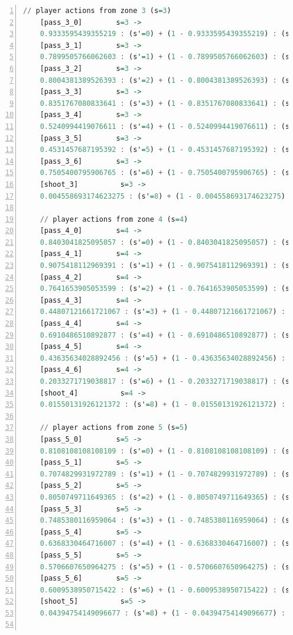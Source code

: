 \documentclass{l4proj}
\begin{document}
\begin{appendices}
\begin{lstlisting}[language=Haskell, numbers=left, caption=Initial MDP specification in the PRISM modelling language.]
	// player actions from zone 3 (s=3)
	[pass_3_0]	      s=3 ->
	0.9333595439355219 : (s'=0) + (1 - 0.9333595439355219) : (s'=7);
	[pass_3_1]	      s=3 ->
	0.7899505766062603 : (s'=1) + (1 - 0.7899505766062603) : (s'=7);
	[pass_3_2]	      s=3 ->
	0.8004381389526393 : (s'=2) + (1 - 0.8004381389526393) : (s'=7);
	[pass_3_3]	      s=3 ->
	0.8351767080833641 : (s'=3) + (1 - 0.8351767080833641) : (s'=7);
	[pass_3_4]	      s=3 ->
	0.5240994419076611 : (s'=4) + (1 - 0.5240994419076611) : (s'=7);
	[pass_3_5]	      s=3 ->
	0.4531457687195392 : (s'=5) + (1 - 0.4531457687195392) : (s'=7);
	[pass_3_6]	      s=3 ->
	0.7505400795906765 : (s'=6) + (1 - 0.7505400795906765) : (s'=7);
	[shoot_3]	       s=3 ->
	0.004558693174623275 : (s'=8) + (1 - 0.004558693174623275) : (s'=7);

	// player actions from zone 4 (s=4)
	[pass_4_0]	      s=4 ->
	0.8403041825095057 : (s'=0) + (1 - 0.8403041825095057) : (s'=7);
	[pass_4_1]	      s=4 ->
	0.9075418112969391 : (s'=1) + (1 - 0.9075418112969391) : (s'=7);
	[pass_4_2]	      s=4 ->
	0.7641653905053599 : (s'=2) + (1 - 0.7641653905053599) : (s'=7);
	[pass_4_3]	      s=4 ->
	0.44807121661721067 : (s'=3) + (1 - 0.44807121661721067) : (s'=7);
	[pass_4_4]	      s=4 ->
	0.6910486510892877 : (s'=4) + (1 - 0.6910486510892877) : (s'=7);
	[pass_4_5]	      s=4 ->
	0.43635634028892456 : (s'=5) + (1 - 0.43635634028892456) : (s'=7);
	[pass_4_6]	      s=4 ->
	0.2033271719038817 : (s'=6) + (1 - 0.2033271719038817) : (s'=7);
	[shoot_4]	       s=4 ->
	0.01550131926121372 : (s'=8) + (1 - 0.01550131926121372) : (s'=7);

	// player actions from zone 5 (s=5)
	[pass_5_0]	      s=5 ->
	0.8108108108108109 : (s'=0) + (1 - 0.8108108108108109) : (s'=7);
	[pass_5_1]	      s=5 ->
	0.7074829931972789 : (s'=1) + (1 - 0.7074829931972789) : (s'=7);
	[pass_5_2]	      s=5 ->
	0.8050749711649365 : (s'=2) + (1 - 0.8050749711649365) : (s'=7);
	[pass_5_3]	      s=5 ->
	0.7485380116959064 : (s'=3) + (1 - 0.7485380116959064) : (s'=7);
	[pass_5_4]	      s=5 ->
	0.6368330464716007 : (s'=4) + (1 - 0.6368330464716007) : (s'=7);
	[pass_5_5]	      s=5 ->
	0.5706607650964275 : (s'=5) + (1 - 0.5706607650964275) : (s'=7);
	[pass_5_6]	      s=5 ->
	0.6009538950715422 : (s'=6) + (1 - 0.6009538950715422) : (s'=7);
	[shoot_5]	       s=5 ->
	0.04394754149096677 : (s'=8) + (1 - 0.04394754149096677) : (s'=7);


\end{lstlisting}
\end{appendices}
\end{document}
